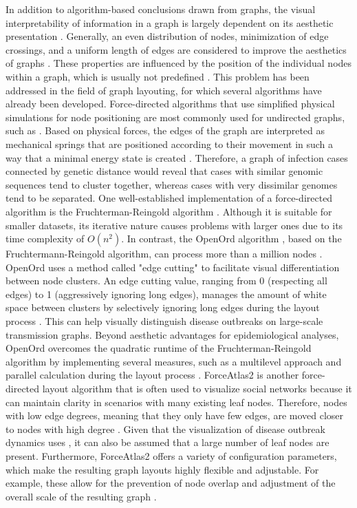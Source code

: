 In addition to algorithm-based conclusions drawn from graphs, the visual interpretability of information in a graph is largely dependent on its aesthetic presentation \cite{Hu2}. Generally, an even distribution of nodes, minimization of edge crossings, and a uniform length of edges are considered to improve the aesthetics of graphs \cite{Hu2, Fru1}. These properties are influenced by the position of the individual nodes within a graph, which is usually not predefined \cite{Hub1}.
This problem has been addressed in the field of graph layouting, for which several algorithms have already been developed. Force-directed algorithms that use simplified physical simulations for node positioning are most commonly used for undirected graphs, such as  \cite{Fru1,Paj1}. Based on physical forces, the edges of the graph are interpreted as mechanical springs that are positioned according to their movement in such a way that a minimal energy state is created \cite{Fru1}. Therefore, a graph of infection cases connected by genetic distance would reveal that cases with similar genomic sequences tend to cluster together, whereas cases with very dissimilar genomes tend to be separated. One well-established implementation of a force-directed algorithm is the Fruchterman-Reingold algorithm \cite{Fru1}. Although it is suitable for smaller datasets, its iterative nature causes problems with larger ones due to its time complexity of $O(n^2)$. In contrast, the OpenOrd algorithm \cite{Mar1}, based on the Fruchtermann-Reingold algorithm, can process more than a million nodes \cite{Bas1}. OpenOrd uses a method called "edge cutting" to facilitate visual differentiation between node clusters. An edge cutting value, ranging from 0 (respecting all edges) to 1 (aggressively ignoring long edges), manages the amount of white space between clusters by selectively ignoring long edges during the layout process \cite{Mar1}. This can help visually distinguish disease outbreaks on large-scale transmission graphs. Beyond aesthetic advantages for epidemiological analyses, OpenOrd overcomes the quadratic runtime of the Fruchterman-Reingold algorithm by implementing several measures, such as a multilevel approach and parallel calculation during the layout process \cite{Mar1}.
ForceAtlas2 is another force-directed layout algorithm that is often used to visualize social networks because it can maintain clarity in scenarios with many existing leaf nodes. Therefore, nodes with low edge degrees, meaning that they only have few edges, are moved closer to nodes with high degree \cite{Jac1}. Given that the visualization of disease outbreak dynamics uses , it can also be assumed that a large number of leaf nodes are present. Furthermore, ForceAtlas2 offers a variety of configuration parameters, which make the resulting graph layouts highly flexible and adjustable. For example, these allow for the prevention of node overlap and adjustment of the overall scale of the resulting graph \cite{Jac1}.

